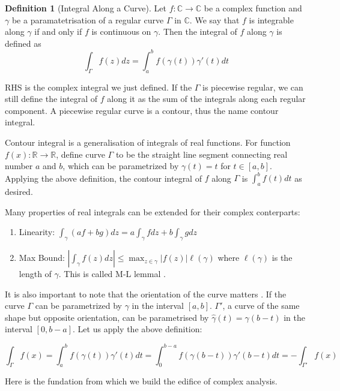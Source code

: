 \documentclass[a4paper,11pt]{article}
\theoremstyle{definition}
\newtheorem{defn}[prop]{Definition}
\newcommand{\bb}[1]{\mathbb{#1}}
\begin{document}
\begin{defn}[Integral Along a Curve]
	Let $f: \bb{C} \rightarrow \bb{C}$ be a complex function and $\gamma$ be a paramatetrisation of a regular curve $\Gamma$ in $\bb{C}$.
	We say that $f$ is integrable along $\gamma$ if and only if $f$ is continuous on $\gamma$.
	Then the integral of $f$ along $\gamma$ is defined as
	\begin{equation}
		\int_{\Gamma} f(z)dz = \int_{a}^{b} f(\gamma(t))\gamma'(t)dt
	\end{equation}
\end{defn}

RHS is the complex integral we just defined.
If the $\Gamma$ is piecewise regular, we can still define the integral of $f$ along it as the sum of the integrals along each regular component. A piecewise regular curve is a contour, thus the name contour integral.

Contour integral is a generalisation of integrals of real functions. For function $f(x): \bb{R} \rightarrow  \bb{R}$, define curve $\Gamma$ to be the straight line segment connecting real number $a$ and $b$, which
can be parametrized by $\gamma(t) = t$ for $t \in [a, b]$. Applying the above definition, the contour integral of $f$ along $\Gamma$ is $\int_a^{b} f(t) dt$ as desired.

Many properties of real integrals can be extended for their complex conterparts:

\begin{enumerate}
	\item Linearity: $\int_{\gamma} (af + bg)dz = a\int_{\gamma} f dz + b\int_{\gamma} g dz$
	\item Max Bound: $|\int_{\gamma} f(z)dz| \leq \max_{z\in \gamma}|f(z)|\ell(\gamma)$ where $\ell(\gamma)$ is the length of $\gamma$. This is called M-L lemmal \cite{gratwick_2023_HCoV}.
\end{enumerate}

It is also important to note that the orientation of the curve matters . If the curve $\Gamma$ can be parametrized by $\gamma$ in the interval $[a, b]$. $\Gamma '$, a curve of the same shape but opposite orientation, can be parametrised by $\hat{\gamma} (t) =\gamma(b-t)$ in the interval $[0, b-a]$. Let us apply the above definition: 

\[
	\int_\Gamma f(x) = \int_{a}^{b} f(\gamma(t))\gamma'(t)dt =\int_{0}^{b-a} f(\gamma(b-t))\gamma'(b-t)dt = -\int_{\Gamma'} f(x)
\]

Here is the fundation from which we build the edifice of complex analysis.

\printbibliography %
\end{document}
